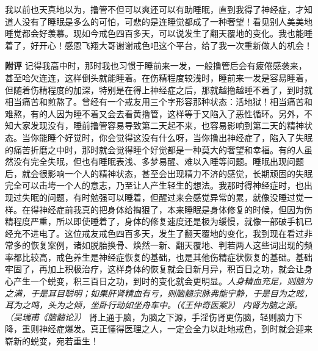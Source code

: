 \begin{case}
    我以前也天真地以为，撸管不但可以爽还可以有助睡眠，直到我得了神经症，才知道人没有了睡眠是多么的可怕，可悲的是连睡觉都成了一种奢望！看见别人美美地睡觉都会好羡慕。现如今戒色四百多天，可以说发生了翻天覆地的变化。我也能睡着了，好开心！感恩飞翔大哥谢谢戒色吧这个平台，给了我一次重新做人的机会！

    \textbf{附评} 记得我高中时，那时我也习惯于睡前来一发，一般撸管后会有疲倦感袭来，甚至哈欠连连，这样倒头就能睡着。在伤精程度较浅时，睡前来一发是容易睡着，但随着伤精程度的加深，特别是在得上神经症之后，那就越撸越睡不着了，到时就相当痛苦和煎熬了。曾经有一个戒友用三个字形容那种状态：活地狱！相当痛苦和难熬，有的人因为睡不着又会去看黄撸管，这样等于又陷入了恶性循环。另外，不知大家发现没有，睡前撸管容易导致第二天起不来，也容易影响到第二天的精神状态。当你能睡个好觉时，你会觉得这没有什么呀，当你撸出神经症了，陷入了失眠的痛苦折磨之中时，那时就会觉得睡个好觉都是一种莫大的奢望和幸福。有的人虽然没有完全失眠，但也有睡眠表浅、多梦易醒、难以入睡等问题。睡眠出现问题后，就会很影响一个人的精神状态，甚至会出现精力不济的感觉，长期顽固的失眠完全可以击垮一个人的意志，乃至让人产生轻生的想法。我那时得神经症时，也出现过失眠的问题，有时勉强可以睡着，但醒过来会感觉异常的累，就像没睡过觉一样。在得神经症前我真的把身体给掏狠了，本来睡眠是身体修复的时候，但因为伤精程度严重，所以即使睡着了，身体的修复速度还是极为缓慢，就像一部破手机已经充不进电了。这位戒友戒色四百多天，发生了翻天覆地的变化，我到现在看过非常多的恢复案例，诸如脱胎换骨、焕然一新、翻天覆地、判若两人这些词出现的频率都比较高，戒色养生是神经症恢复的基础，也是其他伤精症状恢复的基础。基础牢固了，再加上积极治疗，这样身体的恢复就会日新月异，积百日之功，就会让身心产生一个蜕变，积三百日之功，到时的变化就会更明显。\textit{人身精血充足，则脑为之满，于是耳目聪明；如果肝肾精血有亏，则脑髓宗脉弗能宁静，于是目为之眩，耳为之鸣，头为之倾，坐卧行动如坐舟车中。（《王仲奇医案》）} \textit{内肾为脑之源。（吴瑞甫《脑髓论》）} 肾上通于脑，为脑之下源，手淫伤肾更伤脑，轻则脑力下降，重则神经症爆发。真正懂得医理之人，一定会全力以赴地戒色，到时就会迎来崭新的蜕变，宛若重生！
\end{case}


